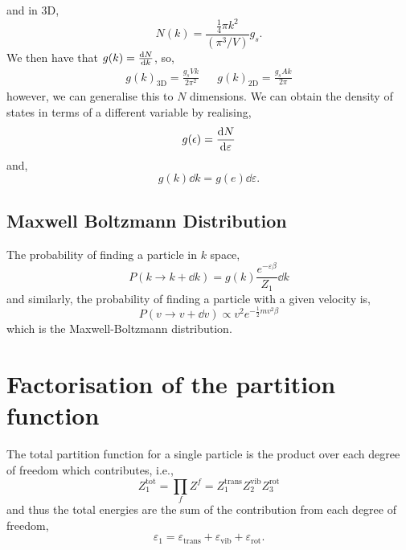 \documentclass{book}
\begin{document}
and in 3D,
\begin{equation}
	N(k) = \frac{\frac{1}{4}\pi k^2}{(\pi^3/V)}g_s.
\end{equation}
We then have that $g(k) = \dv{N}{k}$, so,
\begin{align}
	\boxed{g(k)_{\text{3D}} = \frac{g_sVk}{2\pi^2}} && \boxed{g(k)_{\text{2D}} = \frac{g_sAk}{2\pi}}
\end{align}
however, we can generalise this to $N$ dimensions. We can obtain the density of states in terms of a different variable by realising,
\begin{equation}
	g(\epsilon) = \dv{N}{\varepsilon}
\end{equation}
and,
\begin{equation}
	g(k)\dd{k} = g(e)\dd{\varepsilon}.
\end{equation}
\subsection{Maxwell Boltzmann Distribution}
The probability of finding a particle in $k$ space,
\begin{equation}
	P(k \to k + \dd{k}) = g(k)\frac{e^{-\varepsilon\beta}}{Z_1}\dd{k}
\end{equation}
and similarly, the probability of finding a particle with a given velocity is,
\begin{equation}
	P(v \to v + \dd{v}) \propto v^2e^{-\frac{1}{2}mv^2\beta}
\end{equation}
which is the Maxwell-Boltzmann distribution.
\section{Factorisation of the partition function}
The total partition function for a single particle is the product over each degree of freedom which contributes, i.e.,
\begin{equation}
	Z_1^{\text{tot}} = \prod_{f} Z^f = Z_1^{\text{trans}}Z_2^{\text{vib}}Z_3^{\text{rot}}
\end{equation}
and thus the total energies are the sum of the contribution from each degree of freedom,
\begin{equation}
	\varepsilon_1 = \varepsilon_{\text{trans}} + \varepsilon_{\text{vib}} + \varepsilon_{\text{rot}}.
\end{equation}
\end{document}
